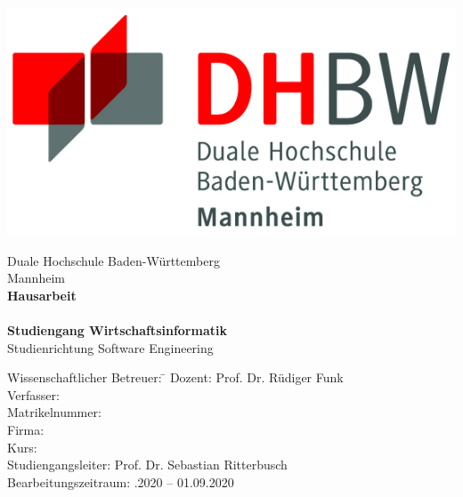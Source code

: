 \begin{titlepage}
    \begin{minipage}{\textwidth}
            \vspace{-2cm}
            \noindent 
            \hfill   \includegraphics{img/logo.jpg}
    \end{minipage}
    \vspace{1em}
    \sffamily
    \begin{center}
        \textsf{\large{}Duale Hochschule Baden-W\"urttemberg\\[1.5mm] Mannheim}\\[2em]
        \textsf{\textbf{\Large{}Hausarbeit}}\\[3mm]
        \textsf{\textbf{\DerTitelDerArbeit}} \\[1.5cm]
        \textsf{\textbf{\Large{}Studiengang Wirtschaftsinformatik}\\[3mm] \textsf{Studienrichtung Software Engineering}}
        
        \vspace{3em}
    \vfill
    
    \begin{minipage}{\textwidth}
    
    \begin{tabbing}
        Wissenschaftlicher Betreuer: \hspace{0.85cm}\=\kill
        Dozent: \> Prof. Dr. Rüdiger Funk \\[1.5mm]
        Verfasser: \> \DerAutorDerArbeit \\[1.5mm]
        Matrikelnummer:  \\[1.5mm]
        Firma: \> \DerNameDerFirma  \\[1.5mm]
        Kurs: \> \DieKursbezeichnung \\[1.5mm]
        Studiengangsleiter: \> Prof. Dr. Sebastian Ritterbusch  \\[1.5mm]
        Bearbeitungszeitraum: .2020 -- 01.09.2020
    \end{tabbing}
    \end{minipage}
    
    \end{center}
    
    \end{titlepage}